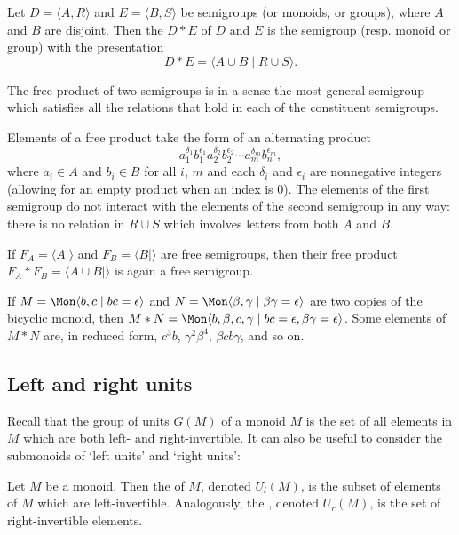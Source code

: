 \documentclass[noindex,noinsetproof,emphthm,12pt]{lmaths}
\begin{document}
\begin{defn}
Let $D = \langle A, R \rangle$ and $E = \langle B, S \rangle$ be semigroups (or monoids, or groups), where $A$ and $B$ are disjoint. Then the  $D \ast E$ of $D$ and $E$ is the semigroup (resp. monoid or group) with the presentation
	\[ D \ast E = \langle A \cup B \mid R \cup S \rangle. \]
\end{defn}

The free product of two semigroups is in a sense the most general semigroup which satisfies all the relations that hold in each of the constituent semigroups.

Elements of a free product take the form of an alternating product
	\[ a_1^{\delta_1} b_1^{\epsilon_1} a_2^{\delta_2} b_2^{\epsilon_2} \cdots a_m^{\delta_m} b_n^{\epsilon_m}, \]
where $a_i \in A$ and $b_i \in B$ for all $i$, $m$ and each $\delta_i$ and $\epsilon_i$ are nonnegative integers (allowing for an empty product when an index is 0). The elements of the first semigroup do not interact with the elements of the second semigroup in any way: there is no relation in $R \cup S$ which involves letters from both $A$ and $B$.

\begin{example}
	If $F_A = \langle A \mid \rangle$ and $F_B = \langle B \mid \rangle$ are free semigroups, then their free product $F_A \ast F_B = \langle A \cup B \mid \rangle$ is again a free semigroup.
\end{example}

\begin{example}
	If $M = \Mon \langle b, c \mid bc = \epsilon \rangle$ and $N = \Mon \langle \beta, \gamma \mid \beta\gamma = \epsilon \rangle$ are two copies of the bicyclic monoid, then $M \ast N = \Mon \langle b, \beta, c, \gamma \mid bc = \epsilon, \beta\gamma = \epsilon \rangle$. Some elements of $M \ast N$ are, in reduced form, $c^3 b$, $\gamma^2\beta^4$, $\beta c b \gamma$, and so on.
\end{example}


\subsection{Left and right units}

Recall that the group of units $G(M)$ of a monoid $M$ is the set of all elements in $M$ which are both left- and right-invertible. It can also be useful to consider the submonoids of `left units' and `right units':

\begin{defn}
	Let $M$ be a monoid. Then the  of $M$, denoted $U_l(M)$, is the subset of elements of $M$ which are left-invertible. Analogously, the , denoted $U_r(M)$, is the set of right-invertible elements.
\end{defn}
\end{document}
